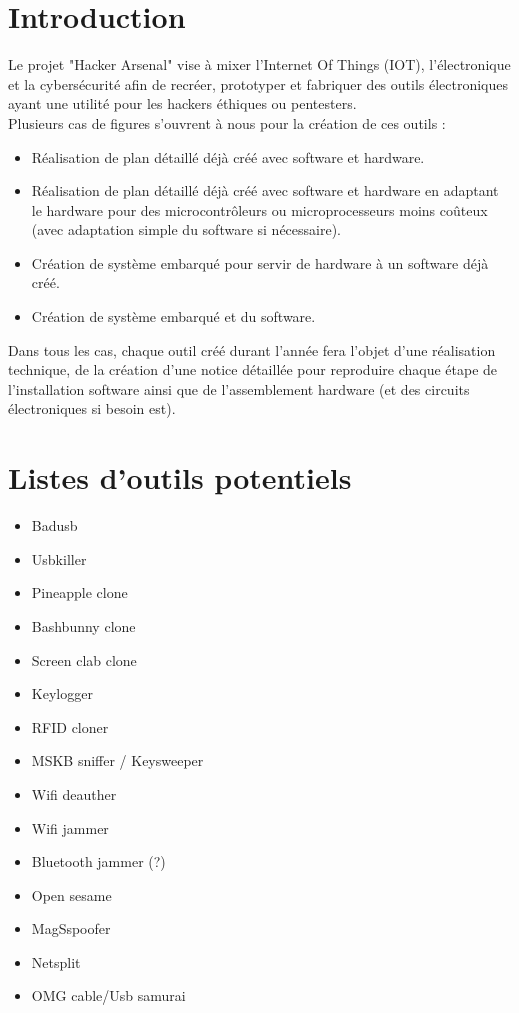 \documentclass[12pt]{article}
\begin{document}
    \section{Introduction}
    Le projet "Hacker Arsenal" vise à mixer l'Internet Of Things (IOT), l'électronique et la cybersécurité afin de recréer, prototyper et fabriquer des outils électroniques ayant une utilité pour les hackers éthiques ou pentesters.\\
Plusieurs cas de figures s'ouvrent à nous pour la création de ces outils :
    \begin{itemize}
        \item{Réalisation de plan détaillé déjà créé avec software et hardware.}
        \item{Réalisation de plan détaillé déjà créé avec software et hardware en adaptant le hardware pour des microcontrôleurs ou microprocesseurs moins coûteux (avec adaptation simple du software si nécessaire).}
        \item{Création de système embarqué pour servir de hardware à un software déjà créé.}
        \item{Création de système embarqué et du software.}
    \end{itemize}
    \noindent Dans tous les cas, chaque outil créé durant l'année fera l'objet d'une réalisation technique, de la création d'une notice détaillée pour reproduire chaque étape de l'installation software ainsi que de l'assemblement hardware (et des circuits électroniques si besoin est).

    \section{Listes d’outils potentiels}
    \begin{itemize}
        \item{Badusb}
        \item{Usbkiller}
        \item{Pineapple clone}
        \item{Bashbunny clone}
        \item{Screen clab clone}
        \item{Keylogger}
        \item{RFID cloner}
        \item{MSKB sniffer / Keysweeper}
        \item{Wifi deauther}
        \item{Wifi jammer}
        \item{Bluetooth jammer (?)}
        \item{Open sesame}
        \item{MagSspoofer}
        \item{Netsplit}
        \item{OMG cable/Usb samurai}
    \end{itemize}
\end{document}
